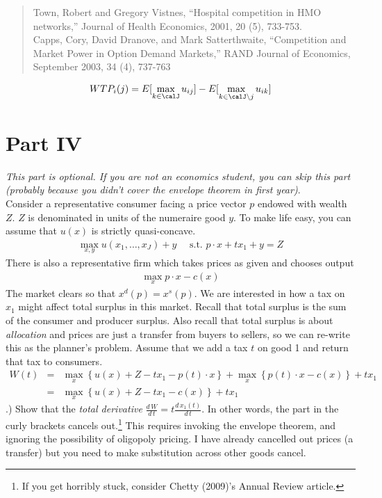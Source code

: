 \documentclass[12pt]{article}
\begin{document}
\begin{quote}
Town, Robert and Gregory Vistnes, ``Hospital competition in HMO networks,'' Journal of
Health Economics, 2001, 20 (5), 733-753.\\

Capps, Cory, David Dranove, and Mark Satterthwaite, ``Competition and Market Power in Option Demand Markets,'' 
RAND Journal of Economics, September 2003, 34 (4), 737-763
\end{quote}

\begin{align*}
WTP_i(j) = E[ \max_{k \in \calJ} u_{ij}] - E[ \max_{k \in \calJ \setminus j} u_{ik}]
\end{align*}


\section*{\normalsize Part IV}
\textit{This part is optional. If you are not an economics student, you can skip this part (probably because you didn't cover the envelope theorem in first year)}.\\



\noindent Consider a representative consumer facing a price vector $p$ endowed with wealth $Z$. $Z$ is denominated in units of the numeraire good $y$. To make life easy, you can assume that $u(x)$ is strictly quasi-concave.
\begin{eqnarray*}
\max_{x,y} u(x_1,\ldots,x_J) + y \quad \mbox{ s.t. } p \cdot x + t x_1 + y = Z
\end{eqnarray*}
There is also a representative firm which takes prices as given and chooses output
\begin{eqnarray*}
\max_x p \cdot x - c(x)
\end{eqnarray*}
The market clears so that $x^d(p) = x^s(p)$. We are interested in how a tax on $x_1$ might affect total surplus in this market. Recall that total surplus is the sum of the consumer and producer surplus. Also recall that total surplus is about \textit{allocation} and prices are just a transfer from buyers to sellers, so we can re-write this as the planner's problem. Assume that we add a tax $t$ on good 1 and return that tax to consumers.
\begin{eqnarray*}
W(t) &=& \max_x \left\{  u(x) + Z - t x_1 - p(t) \cdot x \right\}  + \max_x \left\{  p(t) \cdot x - c(x)\right\} + t x_1\\
&=& \max_x \left\{  u(x) + Z - t x_1  - c(x)\right\} + t x_1
\end{eqnarray*}
.) Show that the \textit{total derivative} $\frac{d\, W}{d\, t} = t \frac{d\, x_1(t)}{d\, t}$. In other words, the part in the curly brackets cancels out.\footnote{If you get horribly stuck, consider Chetty (2009)'s Annual Review article.} This requires invoking the envelope theorem, and ignoring the possibility of oligopoly pricing. I have already cancelled out prices (a transfer) but you need to make substitution across other goods cancel.\\
\end{document}
